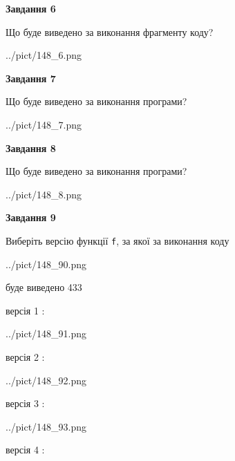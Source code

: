 \documentclass[12pt, ukrainian]{article}
\def\code#1{\Verb!#1!}
\begin{document}
{\begin {large}
{\begin {center}\textbf{Завдання 6}\end {center}}

Що буде виведено за виконання фрагменту коду?\par
\begin{center}
	{../pict/148_6.png}
\end{center}
\newpage

{\begin {center}\textbf{Завдання 7}\end {center}}

Що буде виведено за виконання програми?\par
\begin{center}
	{../pict/148_7.png}
\end{center}
\newpage

{\begin {center}\textbf{Завдання 8}\end {center}}

Що буде виведено за виконання програми?\par
\begin{center}
	{../pict/148_8.png}
\end{center}
\newpage

{\begin {center}\textbf{Завдання 9}\end {center}}

Виберіть версію функції \code{f}, за якої за виконання коду
\begin{center}
	{../pict/148_90.png}
\end{center}
буде виведено 433

\vspace{5mm}
версія 1 :

\begin{center}
	{../pict/148_91.png}
\end{center}
версія 2 :

\begin{center}
	{../pict/148_92.png}
\end{center}
версія 3 :

\begin{center}
	{../pict/148_93.png}
\end{center}
версія 4 :


\end{large}}
\end{document}
